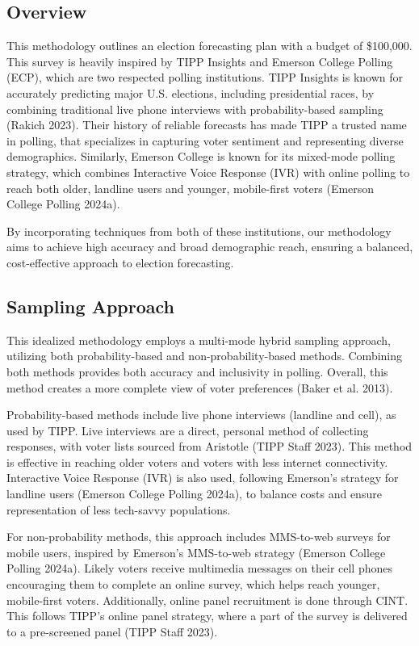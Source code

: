 \documentclass[
  letterpaper,
  DIV=11,
  numbers=noendperiod]{scrartcl}
\begin{document}
\hypertarget{overview-1}{%
\subsection{Overview}\label{overview-1}}

This methodology outlines an election forecasting plan with a budget of
\$100,000. This survey is heavily inspired by TIPP Insights and Emerson
College Polling (ECP), which are two respected polling institutions.
TIPP Insights is known for accurately predicting major U.S. elections,
including presidential races, by combining traditional live phone
interviews with probability-based sampling (Rakich 2023). Their history
of reliable forecasts has made TIPP a trusted name in polling, that
specializes in capturing voter sentiment and representing diverse
demographics. Similarly, Emerson College is known for its mixed-mode
polling strategy, which combines Interactive Voice Response (IVR) with
online polling to reach both older, landline users and younger,
mobile-first voters (Emerson College Polling 2024a).

By incorporating techniques from both of these institutions, our
methodology aims to achieve high accuracy and broad demographic reach,
ensuring a balanced, cost-effective approach to election forecasting.

\hypertarget{sampling-approach}{%
\subsection{Sampling Approach}\label{sampling-approach}}

This idealized methodology employs a multi-mode hybrid sampling
approach, utilizing both probability-based and non-probability-based
methods. Combining both methods provides both accuracy and inclusivity
in polling. Overall, this method creates a more complete view of voter
preferences (Baker et al. 2013).

Probability-based methods include live phone interviews (landline and
cell), as used by TIPP. Live interviews are a direct, personal method of
collecting responses, with voter lists sourced from Aristotle (TIPP
Staff 2023). This method is effective in reaching older voters and
voters with less internet connectivity. Interactive Voice Response (IVR)
is also used, following Emerson's strategy for landline users (Emerson
College Polling 2024a), to balance costs and ensure representation of
less tech-savvy populations.

For non-probability methods, this approach includes MMS-to-web surveys
for mobile users, inspired by Emerson's MMS-to-web strategy (Emerson
College Polling 2024a). Likely voters receive multimedia messages on
their cell phones encouraging them to complete an online survey, which
helps reach younger, mobile-first voters. Additionally, online panel
recruitment is done through CINT. This follows TIPP's online panel
strategy, where a part of the survey is delivered to a pre-screened
panel (TIPP Staff 2023).
\end{document}
